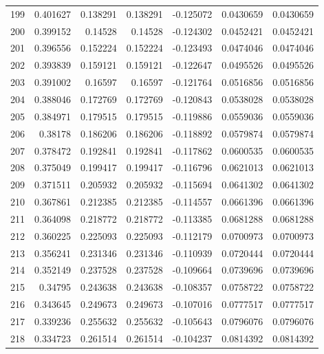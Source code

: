 \begin{tabular}{rrrrrrr}
 199 &  0.401627    & 0.138291    & 0.138291    & -0.125072    & 0.0430659   & 0.0430659   \\
 200 &  0.399152    & 0.14528     & 0.14528     & -0.124302    & 0.0452421   & 0.0452421   \\
 201 &  0.396556    & 0.152224    & 0.152224    & -0.123493    & 0.0474046   & 0.0474046   \\
 202 &  0.393839    & 0.159121    & 0.159121    & -0.122647    & 0.0495526   & 0.0495526   \\
 203 &  0.391002    & 0.16597     & 0.16597     & -0.121764    & 0.0516856   & 0.0516856   \\
 204 &  0.388046    & 0.172769    & 0.172769    & -0.120843    & 0.0538028   & 0.0538028   \\
 205 &  0.384971    & 0.179515    & 0.179515    & -0.119886    & 0.0559036   & 0.0559036   \\
 206 &  0.38178     & 0.186206    & 0.186206    & -0.118892    & 0.0579874   & 0.0579874   \\
 207 &  0.378472    & 0.192841    & 0.192841    & -0.117862    & 0.0600535   & 0.0600535   \\
 208 &  0.375049    & 0.199417    & 0.199417    & -0.116796    & 0.0621013   & 0.0621013   \\
 209 &  0.371511    & 0.205932    & 0.205932    & -0.115694    & 0.0641302   & 0.0641302   \\
 210 &  0.367861    & 0.212385    & 0.212385    & -0.114557    & 0.0661396   & 0.0661396   \\
 211 &  0.364098    & 0.218772    & 0.218772    & -0.113385    & 0.0681288   & 0.0681288   \\
 212 &  0.360225    & 0.225093    & 0.225093    & -0.112179    & 0.0700973   & 0.0700973   \\
 213 &  0.356241    & 0.231346    & 0.231346    & -0.110939    & 0.0720444   & 0.0720444   \\
 214 &  0.352149    & 0.237528    & 0.237528    & -0.109664    & 0.0739696   & 0.0739696   \\
 215 &  0.34795     & 0.243638    & 0.243638    & -0.108357    & 0.0758722   & 0.0758722   \\
 216 &  0.343645    & 0.249673    & 0.249673    & -0.107016    & 0.0777517   & 0.0777517   \\
 217 &  0.339236    & 0.255632    & 0.255632    & -0.105643    & 0.0796076   & 0.0796076   \\
 218 &  0.334723    & 0.261514    & 0.261514    & -0.104237    & 0.0814392   & 0.0814392   \\

\end{tabular}
